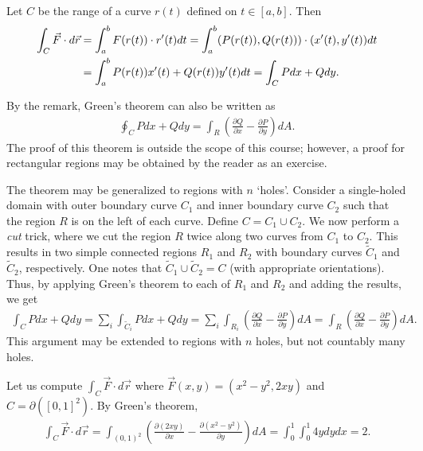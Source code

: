 \begin{remark}
    Let $C$ be the range of a curve $r(t)$ defined on $t \in [a,b]$. Then
    \begin{align}
        \int_{C} \vec{F} \cdot d\vec{r} &= \int_{a}^{b} F(r(t)) \cdot r'(t) dt = \int_{a}^{b} (P(r(t)),Q(r(t))) \cdot (x'(t),y'(t)) dt \notag \\ &= \int_{a}^{b} P(r(t)) x'(t) + Q(r(t)) y'(t) dt = \int_{C} P dx + Q dy.
    \end{align}
\end{remark}
By the remark, Green's theorem can also be written as
\begin{align}
    \oint_{C} P dx + Q dy = \int_{R} \left( \frac{\partial Q}{\partial x} - \frac{\partial P}{\partial y} \right) dA.
\end{align}
The proof of this theorem is outside the scope of this course; however, a proof for rectangular regions may be obtained by the reader as an exercise.

The theorem may be generalized to regions with $n$ `holes'. Consider a single-holed domain with outer boundary curve $C_{1}$ and inner boundary curve $C_{2}$ such that the region $R$ is on the left of each curve. Define $C = C_{1} \cup C_{2}$. We now perform a \textit{cut} trick, where we cut the region $R$ twice along two curves from $C_{1}$ to $C_{2}$. This results in two simple connected regions $R_{1}$ and $R_{2}$ with boundary curves $\tilde{C}_{1}$ and $\tilde{C}_{2}$, respectively. One notes that $\tilde{C}_{1} \cup \tilde{C}_{2} = C$ (with appropriate orientations). Thus, by applying Green's theorem to each of $R_{1}$ and $R_{2}$ and adding the results, we get
\begin{align}
    \int_{C} Pdx + Qdy = \sum_{i} \int_{\tilde{C}_{i}} P dx + Q dy = \sum_{i} \int_{R_{i}} \left(\frac{\partial Q}{\partial x} - \frac{\partial P}{\partial y} \right) dA = \int_{R} \left( \frac{\partial Q}{\partial x} - \frac{\partial P}{\partial y} \right) dA.
\end{align}
This argument may be extended to regions with $n$ holes, but not countably many holes.

\begin{example}
    Let us compute $\int_{C} \vec{F} \cdot d\vec{r}$ where $\vec{F}(x,y) = (x^{2}-y^{2},2xy)$ and $C = \partial ([0,1]^{2})$. By Green's theorem,
    \begin{align}
        \int_{C} \vec{F} \cdot d\vec{r} = \int_{(0,1)^{2}} \left( \frac{\partial (2xy)}{\partial x} - \frac{\partial (x^{2}-y^{2})}{\partial y} \right) dA = \int_{0}^{1} \int_{0}^{1} 4y dy dx = 2.
    \end{align}
\end{example}

